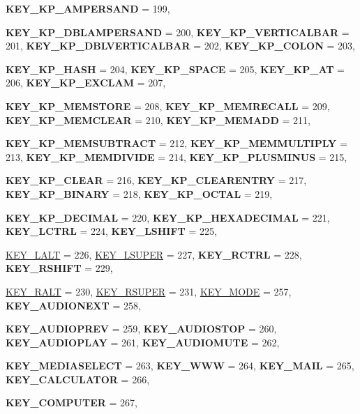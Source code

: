 \begin{DoxyCompactItemize}
{\bfseries KEY\_\-KP\_\-AMPERSAND} =  199, 
\par
{\bfseries KEY\_\-KP\_\-DBLAMPERSAND} =  200, 
{\bfseries KEY\_\-KP\_\-VERTICALBAR} =  201, 
{\bfseries KEY\_\-KP\_\-DBLVERTICALBAR} =  202, 
{\bfseries KEY\_\-KP\_\-COLON} =  203, 
\par
{\bfseries KEY\_\-KP\_\-HASH} =  204, 
{\bfseries KEY\_\-KP\_\-SPACE} =  205, 
{\bfseries KEY\_\-KP\_\-AT} =  206, 
{\bfseries KEY\_\-KP\_\-EXCLAM} =  207, 
\par
{\bfseries KEY\_\-KP\_\-MEMSTORE} =  208, 
{\bfseries KEY\_\-KP\_\-MEMRECALL} =  209, 
{\bfseries KEY\_\-KP\_\-MEMCLEAR} =  210, 
{\bfseries KEY\_\-KP\_\-MEMADD} =  211, 
\par
{\bfseries KEY\_\-KP\_\-MEMSUBTRACT} =  212, 
{\bfseries KEY\_\-KP\_\-MEMMULTIPLY} =  213, 
{\bfseries KEY\_\-KP\_\-MEMDIVIDE} =  214, 
{\bfseries KEY\_\-KP\_\-PLUSMINUS} =  215, 
\par
{\bfseries KEY\_\-KP\_\-CLEAR} =  216, 
{\bfseries KEY\_\-KP\_\-CLEARENTRY} =  217, 
{\bfseries KEY\_\-KP\_\-BINARY} =  218, 
{\bfseries KEY\_\-KP\_\-OCTAL} =  219, 
\par
{\bfseries KEY\_\-KP\_\-DECIMAL} =  220, 
{\bfseries KEY\_\-KP\_\-HEXADECIMAL} =  221, 
{\bfseries KEY\_\-LCTRL} =  224, 
{\bfseries KEY\_\-LSHIFT} =  225, 
\par
\hyperlink{classphys_1_1MetaCode_a3e501cbb5bf0f6f1fdb7211465bda8d8a2454f5b9aa3d9f34db185fe659f3e751}{KEY\_\-LALT} =  226, 
\hyperlink{classphys_1_1MetaCode_a3e501cbb5bf0f6f1fdb7211465bda8d8aab77afaba4fc97faa9b9fe40d3a9ebbb}{KEY\_\-LSUPER} =  227, 
{\bfseries KEY\_\-RCTRL} =  228, 
{\bfseries KEY\_\-RSHIFT} =  229, 
\par
\hyperlink{classphys_1_1MetaCode_a3e501cbb5bf0f6f1fdb7211465bda8d8aee151fcf77cce58411d19d9cb679875e}{KEY\_\-RALT} =  230, 
\hyperlink{classphys_1_1MetaCode_a3e501cbb5bf0f6f1fdb7211465bda8d8a84e2235ece031f83821867486ff52149}{KEY\_\-RSUPER} =  231, 
\hyperlink{classphys_1_1MetaCode_a3e501cbb5bf0f6f1fdb7211465bda8d8a9e26ea2006e876ccaa80fe4ae441da46}{KEY\_\-MODE} =  257, 
{\bfseries KEY\_\-AUDIONEXT} =  258, 
\par
{\bfseries KEY\_\-AUDIOPREV} =  259, 
{\bfseries KEY\_\-AUDIOSTOP} =  260, 
{\bfseries KEY\_\-AUDIOPLAY} =  261, 
{\bfseries KEY\_\-AUDIOMUTE} =  262, 
\par
{\bfseries KEY\_\-MEDIASELECT} =  263, 
{\bfseries KEY\_\-WWW} =  264, 
{\bfseries KEY\_\-MAIL} =  265, 
{\bfseries KEY\_\-CALCULATOR} =  266, 
\par
{\bfseries KEY\_\-COMPUTER} =  267, 

\end{DoxyCompactItemize}
